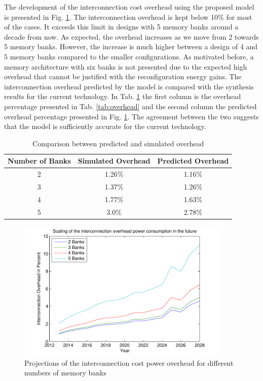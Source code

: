  The development of the interconnection cost overhead using the proposed model is presented in Fig. \ref{fig:overheadE}.
 The interconnection overhead is kept below 10\% for most of the cases.
 It exceeds this limit in designs with 5 memory banks around a decade from now.
 As expected, the overhead increases as we move from 2 towards 5 memory banks.
 However, the increase is much higher between a design of 4 and 5 memory banks compared to the smaller configurations.
 As motivated before, a memory architecture with six banks is not presented due to the expected high overhead that cannot be justified with the reconfiguration energy gains.
 The interconnection overhead predicted by the model is compared with the synthesis results for the current technology.
 In Tab. \ref{tab:verification} the first column is the overhead percentage presented in Tab. \ref{tab:overhead} and the second column the predicted overhead percentage presented in Fig. \ref{fig:overheadE}.
 The agreement between the two suggests that the model is sufficiently accurate for the current technology.
 
 \begin{center}
	\begin{table}
	\caption{Comparison between predicted and simulated overhead}
	\label{tab:verification}
	\centering
	{
	\begin{tabular}{|c|c|c|}
	\hline
	Number of Banks &	Simulated Overhead & Predicted Overhead \\
	\hline
	2 & 1.26\%  & 1.16\% \\
	\hline 
	3 & 1.37\%  & 1.26\% \\
	\hline 
	4 & 1.77\% & 1.63\% \\
	\hline
	5 & 3.0\% & 2.78\% \\
	\hline	
	\end{tabular}}
	\end{table}
\end{center}

 \begin{figure}
 \centering
 \includegraphics[width = 0.9\textwidth]{E/overhead.pdf}
  \caption{Projections of the interconnection cost power overhead for different numbers of memory banks}
 \label{fig:overheadE}
 \end{figure} 

